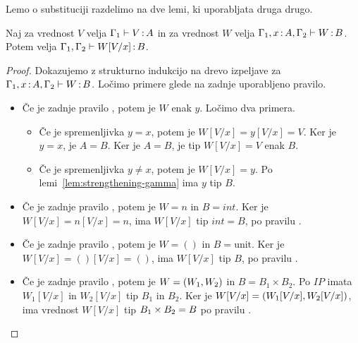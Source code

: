 Lemo o substituciji razdelimo na dve lemi, ki uporabljata druga drugo.

\begin{lema}\label{lem:substitucija-vrednosti}
	Naj za vrednost $V$ velja $\Gamma_1 \vdash V \mathinner{:} A$ in za vrednost $W$ velja $\Gamma_1, x \mathinner{:} A, \Gamma_2 \vdash W \mathinner{:} B$. Potem velja $\Gamma_1, \Gamma_2 \vdash W[V/x] \mathinner{:} B$.
\end{lema}

\begin{proof}
	Dokazujemo z strukturno indukcijo na drevo izpeljave za $\Gamma_1, x \mathinner{:} A, \Gamma_2 \vdash W \mathinner{:} B$.
	Ločimo primere glede na zadnje uporabljeno pravilo.
	
	\begin{itemize}
		\item[\sitem] 
		Če je zadnje pravilo , potem je $W$ enak $y$. Ločimo dva primera.
		\begin{itemize}
			\item Če je spremenljivka $y = x$, potem je $W[V/x] = y[V/x] = V$. Ker je $y = x$, je $A = B$. Ker je $A = B$, je tip $W[V/x] = V$ enak $B$.
			\item Če je spremenljivka $y \neq x$, potem je $W[V/x] = y$. Po lemi~\ref{lem:strengthening-gamma} ima $y$ tip $B$.
		\end{itemize}
		
	
		\item Če je zadnje pravilo , potem je $W=n$ in $B=int$. Ker je $W[V/x] = n[V/x] = n$, ima $W[V/x]$ tip $int = B$, po pravilu .
		
		\item Če je zadnje pravilo , potem je $W=()$ in $B=\text{unit}$. Ker je $W[V/x] = ()[V/x] = ()$, ima $W[V/x]$ tip $B$, po pravilu .
		
		\item Če je zadnje pravilo , potem je $W =( W_1 , W_2 )$ in $B = B_1 \times B_2$. Po $IP$ imata $W_1[V/x]$ in $W_2[V/x]$ tip $B_1$ in $B_2$.
		Ker je $W[V/x] = ( W_1[V/x] , W_2[V/x] )$, ima vrednost $W[V/x]$ tip $B_1 \times B_2 = B$ po pravilu .
		

\end{itemize}
\end{proof}
